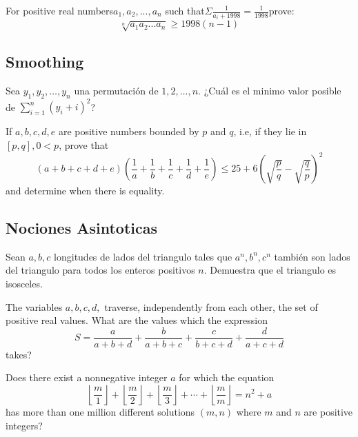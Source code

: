 \documentclass[11pt]{scrartcl}
\begin{document}
\begin{problem} [Vietnam 1998]
    For positive real numbers$a_1,a_2,...,a_n$ such that$\Sigma \frac{1}{a_{i}+1998}=\frac{1}{1998}$prove:$$\sqrt[n]{a_1a_2...a_n}\ge 1998(n-1)$$
\end{problem}

\subsection{Smoothing}
\begin{problem}
    Sea $y_1,y_2, \ldots, y_n$ una permutación de $1,2,\ldots, n$. ¿Cuál es el minimo valor posible de $\sum_{i=1}^n (y_i+i)^2$?
\end{problem}

\begin{problem} [USAMO 1977/5]
    	If $ a,b,c,d,e$ are positive numbers bounded by $ p$ and $ q$, i.e, if they lie in $ [p,q], 0 < p$, prove that
\[ (a + b + c + d + e)\left(\frac {1}{a} + \frac {1}{b} + \frac {1}{c} + \frac {1}{d} + \frac {1}{e}\right) \le 25 + 6\left(\sqrt {\frac {p}{q}} - \sqrt {\frac {q}{p}}\right)^2\]
and determine when there is equality.
\end{problem}

\subsection{Nociones Asintoticas}
\begin{problem}
    Sean $a,b,c$ longitudes de lados del triangulo tales que $a^n, b^n, c^n$ también son lados del triangulo para todos los enteros positivos $n$. Demuestra que el triangulo es isosceles.
\end{problem}

\begin{problem} [IMO 1974/5]
    The variables $a,b,c,d,$ traverse, independently from each other, the set of positive real values. What are the values which the expression\[ S= \frac{a}{a+b+d} + \frac{b}{a+b+c} + \frac{c}{b+c+d} + \frac{d}{a+c+d} \]takes?
\end{problem}

\begin{problem} [EGMO 2021/6]
    Does there exist a nonnegative integer $a$ for which the equation
\[\left\lfloor\frac{m}{1}\right\rfloor + \left\lfloor\frac{m}{2}\right\rfloor + \left\lfloor\frac{m}{3}\right\rfloor + \cdots + \left\lfloor\frac{m}{m}\right\rfloor = n^2 + a\]has more than one million different solutions $(m, n)$ where $m$ and $n$ are positive integers?
\end{problem}
\end{document}
